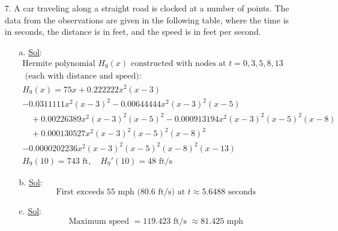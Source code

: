 \begin{enumerate}
    \item[7.] A car traveling along a straight road is clocked at a number of points. The data from the observations are given in the following table, where the time is in seconds, the distance is in feet, and the speed is in feet per second.
        \begin{enumerate}
                \item[a.] 
                    \underline{Sol}:\\
            \[
            \begin{array}{l}
            \text{Hermite polynomial } H_9(x) \text{ constructed with nodes at } t=0,3,5,8,13 \\ \text{ (each with distance and speed):} \\
            H_9(x) = 75x + 0.222222x^2(x-3) \\ - 0.0311111x^2(x-3)^2 - 0.00644444x^2(x-3)^2(x-5) \\
            \quad + 0.00226389x^2(x-3)^2(x-5)^2 - 0.000913194x^2(x-3)^2(x-5)^2(x-8) \\
            \quad + 0.000130527x^2(x-3)^2(x-5)^2(x-8)^2 \\ - 0.0000202236x^2(x-3)^2(x-5)^2(x-8)^2(x-13) \\
            \boxed{H_9(10) = 743 \text{ ft}}, \quad \boxed{H_9'(10) = 48 \text{ ft/s}}
            \end{array}
            \]
            
                \item[b.] 
                    \underline{Sol}:\\
            \[
            \boxed{\text{First exceeds 55 mph (80.6 ft/s) at } t \approx 5.6488 \text{ seconds}}
            \]
            
                \item[c.] 
                    \underline{Sol}:\\
            \[
            \boxed{\text{Maximum speed } = 119.423 \text{ ft/s } \approx 81.425 \text{ mph}}
            \]
        \end{enumerate}

\end{enumerate}
